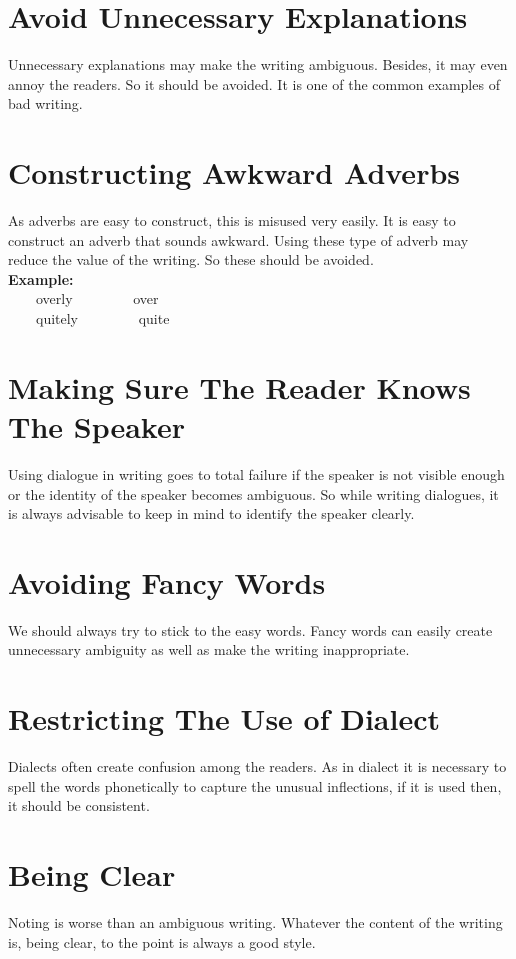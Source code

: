 \documentclass[12pt]{report}
\newcommand{\xmpl}{\textbf{Example:}\\} %
\newcommand{\indnt}{\ \ \ \ } %
\begin{document}
\section{Avoid Unnecessary Explanations}
Unnecessary explanations may make the writing ambiguous. Besides, it may even annoy the readers. So it should be avoided. It is one of the common examples of bad writing.


\section{Constructing Awkward Adverbs}
As adverbs are easy to construct, this is misused very easily. It is easy to construct an adverb that sounds awkward. Using these type of adverb may reduce the value of the writing. So these should be avoided.\\
\xmpl
\indnt overly \indnt \indnt over\\
\indnt quitely \indnt \indnt quite\\


\section{Making Sure The Reader Knows The Speaker}
Using dialogue in writing goes to total failure if the speaker is not visible enough or the identity of the speaker becomes ambiguous.
So while writing dialogues, it is always advisable to keep in mind to identify the speaker clearly.


\section{Avoiding Fancy Words}
We should always try to stick to the easy words. Fancy words can easily create unnecessary ambiguity as well as make the writing inappropriate.


\section{Restricting The Use of Dialect}
Dialects often create confusion among the readers. As in dialect it is necessary to spell the words phonetically to capture the unusual inflections, if it is used then, it should be consistent.


\section{Being Clear}
Noting is worse than an ambiguous writing. Whatever the content of the writing is, being clear, to the point is always a good style.
\end{document}
